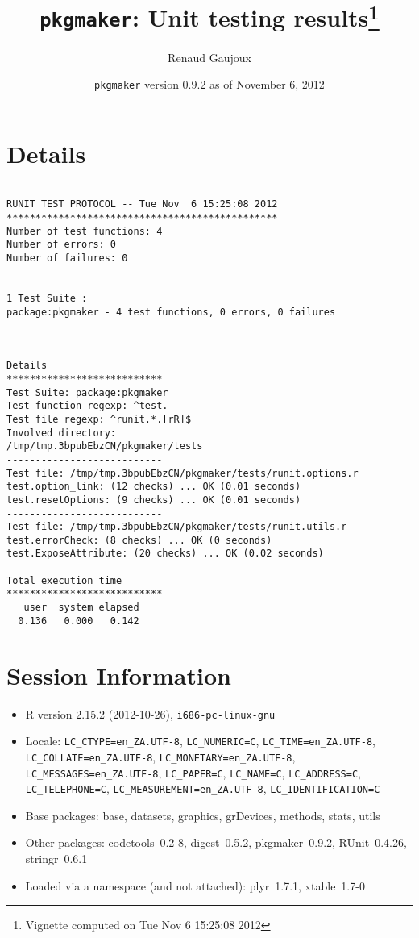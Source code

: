 \documentclass[10pt]{article}
\author{Renaud Gaujoux}
\title{\texttt{pkgmaker}: Unit testing results\footnote{Vignette computed  on Tue Nov  6 15:25:08 2012}}
\date{\texttt{pkgmaker} version 0.9.2 as of November  6, 2012}
\begin{document}
\maketitle

\section{Details}
\begin{verbatim}

RUNIT TEST PROTOCOL -- Tue Nov  6 15:25:08 2012 
*********************************************** 
Number of test functions: 4 
Number of errors: 0 
Number of failures: 0 

 
1 Test Suite : 
package:pkgmaker - 4 test functions, 0 errors, 0 failures



Details 
*************************** 
Test Suite: package:pkgmaker 
Test function regexp: ^test. 
Test file regexp: ^runit.*.[rR]$ 
Involved directory: 
/tmp/tmp.3bpubEbzCN/pkgmaker/tests 
--------------------------- 
Test file: /tmp/tmp.3bpubEbzCN/pkgmaker/tests/runit.options.r 
test.option_link: (12 checks) ... OK (0.01 seconds)
test.resetOptions: (9 checks) ... OK (0.01 seconds)
--------------------------- 
Test file: /tmp/tmp.3bpubEbzCN/pkgmaker/tests/runit.utils.r 
test.errorCheck: (8 checks) ... OK (0 seconds)
test.ExposeAttribute: (20 checks) ... OK (0.02 seconds)

Total execution time
***************************
   user  system elapsed 
  0.136   0.000   0.142 

\end{verbatim}

\section*{Session Information}
\begin{itemize}\raggedright
  \item R version 2.15.2 (2012-10-26), \verb|i686-pc-linux-gnu|
  \item Locale: \verb|LC_CTYPE=en_ZA.UTF-8|, \verb|LC_NUMERIC=C|, \verb|LC_TIME=en_ZA.UTF-8|, \verb|LC_COLLATE=en_ZA.UTF-8|, \verb|LC_MONETARY=en_ZA.UTF-8|, \verb|LC_MESSAGES=en_ZA.UTF-8|, \verb|LC_PAPER=C|, \verb|LC_NAME=C|, \verb|LC_ADDRESS=C|, \verb|LC_TELEPHONE=C|, \verb|LC_MEASUREMENT=en_ZA.UTF-8|, \verb|LC_IDENTIFICATION=C|
  \item Base packages: base, datasets, graphics, grDevices, methods,
    stats, utils
  \item Other packages: codetools~0.2-8, digest~0.5.2, pkgmaker~0.9.2,
    RUnit~0.4.26, stringr~0.6.1
  \item Loaded via a namespace (and not attached): plyr~1.7.1,
    xtable~1.7-0
\end{itemize}
\end{document}
